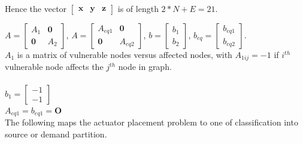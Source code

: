\documentclass[authoryear,preprint,review,12pt]{elsarticle}
\begin{document}
Hence the vector $\left[\mathbf{\begin{array}{ccc}
\mathbf{x} & y & z\end{array}}\right]$ is of length $2*N+E=21$.

$A=\left[\begin{array}{cc}
A_{1} & \mathbf{0}\\
\mathbf{0} & A_{2}
\end{array}\right]$, $A=\left[\begin{array}{cc}
A_{eq1} & \mathbf{0}\\
\mathbf{0} & A_{eq2}
\end{array}\right]$, $b=\left[\begin{array}{c}
b_{1}\\
b_{2}
\end{array}\right]$, $b_{eq}=\left[\begin{array}{c}
b_{eq1}\\
b_{eq2}
\end{array}\right]$.\\

$A_{1}$ is a matrix of vulnerable nodes versus affected nodes, with $A_{1ij}=-1$ if $i^{th}$ vulnerable node affects the $j^{th}$ node in graph.\\ %


\\


$b_{1}=\left[\begin{array}{c}
-1\\
-1
\end{array}\right]$\\



$A_{eq1}=b_{eq1}=\mathbf{O}$\\

The following maps the actuator placement problem to one of classification
into source or demand partition.
\end{document}
